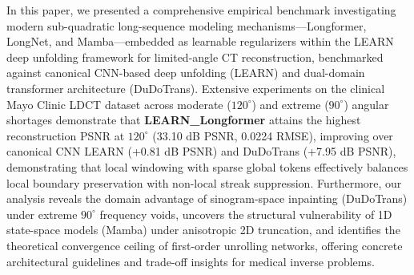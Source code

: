 \documentclass[runningheads]{llncs}
\begin{document}
In this paper, we presented a comprehensive empirical benchmark investigating modern sub-quadratic long-sequence modeling mechanisms---Longformer, LongNet, and Mamba---embedded as learnable regularizers within the LEARN deep unfolding framework for limited-angle CT reconstruction, benchmarked against canonical CNN-based deep unfolding (LEARN) and dual-domain transformer architecture (DuDoTrans). Extensive experiments on the clinical Mayo Clinic LDCT dataset across moderate ($120^\circ$) and extreme ($90^\circ$) angular shortages demonstrate that \textbf{LEARN\_Longformer} attains the highest reconstruction PSNR at $120^\circ$ (33.10 dB PSNR, 0.0224 RMSE), improving over canonical CNN LEARN (+0.81 dB PSNR) and DuDoTrans (+7.95 dB PSNR), demonstrating that local windowing with sparse global tokens effectively balances local boundary preservation with non-local streak suppression. Furthermore, our analysis reveals the domain advantage of sinogram-space inpainting (DuDoTrans) under extreme $90^\circ$ frequency voids, uncovers the structural vulnerability of 1D state-space models (Mamba) under anisotropic 2D truncation, and identifies the theoretical convergence ceiling of first-order unrolling networks, offering concrete architectural guidelines and trade-off insights for medical inverse problems.



\end{document}
